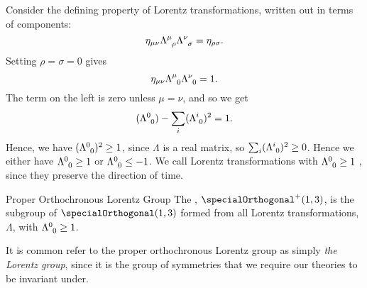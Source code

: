 \documentclass[fleqn]{NotesClass}
\newcommand{\minkowskiMetric}{\eta}
\begin{document}
    Consider the defining property of Lorentz transformations, written out in terms of components:
    \begin{equation}
        \minkowskiMetric_{\mu\nu} \tensor{\Lambda}{^\mu_\rho} \tensor{\Lambda}{^\nu_\sigma} = \minkowskiMetric_{\rho\sigma}.
    \end{equation}
    Setting \(\rho = \sigma = 0\) gives
    \begin{equation}
        \minkowskiMetric_{\mu\nu} \tensor{\Lambda}{^\mu_0} \tensor{\Lambda}{^\nu_0} = 1.
    \end{equation}
    The term on the left is zero unless \(\mu = \nu\), and so we get
    \begin{equation}
        (\tensor{\Lambda}{^0_0}) - \sum_i (\tensor{\Lambda}{^i_0})^2 = 1.
    \end{equation}
    Hence, we have \((\tensor{\Lambda}{^0_0})^2 \ge 1\), since \(\Lambda\) is a real matrix, so \(\sum_i(\tensor{\Lambda}{^i_0})^2 \ge 0\).
    Hence we either have \(\tensor{\Lambda}{^0_0} \ge 1\) or \(\tensor{\Lambda}{^0_0} \le -1\).
    We call Lorentz transformations with \(\tensor{\Lambda}{^0_0} \ge 1\) , since they preserve the direction of time.
    
    \begin{dfn}{Proper Orthochronous Lorentz Group}{}
        The , \(\specialOrthogonal^+(1, 3)\), is the subgroup of \(\specialOrthogonal(1, 3)\) formed from all Lorentz transformations, \(\Lambda\), with \(\tensor{\Lambda}{^0_0} \ge 1\).
    \end{dfn}
    
    It is common refer to the proper orthochronous Lorentz group as simply \emph{the Lorentz group}, since it is the group of symmetries that we require our theories to be invariant under.
    
\end{document}
